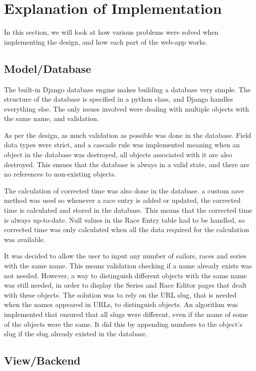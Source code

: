 \documentclass{l4proj}
\begin{document}
\section{Explanation of Implementation}
In this section, we will look at how various problems were solved when implementing the design, and how each part of the web-app works.

\subsection{Model/Database}

The built-in Django database engine makes building a database very simple. The structure of the database is specified in a python class, and Django handles everything else. The only issues involved were dealing with multiple objects with the same name, and validation.

As per the design, as much validation as possible was done in the database. Field data types were strict, and a cascade rule was implemented meaning when an object in the database was destroyed, all objects associated with it are also destroyed. This ensues that the database is always in a valid state, and there are no references to non-existing objects.

The calculation of corrected time was also done in the database. a custom save method was used so whenever a race entry is added or updated, the corrected time is calculated and stored in the database. This means that the corrected time is always up-to-date. Null values in the Race Entry table had to be handled, so corrected time was only calculated when all the data required for the calculation was available.

It was decided to allow the user to input any number of sailors, races and series with the same name. This means validation checking if a name already exists was not needed. However, a way to distinguish different objects with the same name was still needed, in order to display the Series and Race Editor pages that dealt with these objects. The solution was to rely on the URL slug, that is needed when the names appeared in URLs, to distinguish objects. An algorithm was implemented that ensured that all slugs were different, even if the name of some of the objects were the same. It did this by appending numbers to the object's slug if the slug already existed in the database.
 
\subsection{View/Backend}
\end{document}
